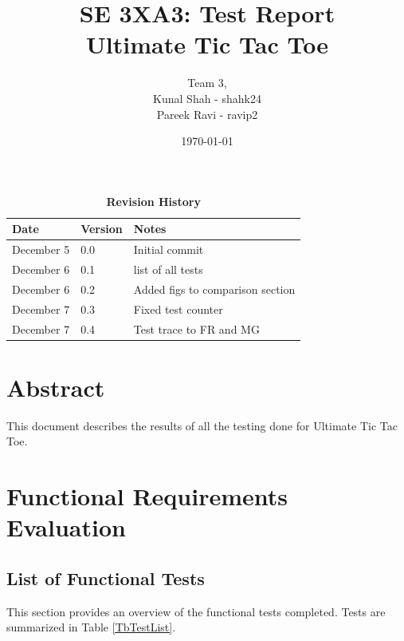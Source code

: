 \documentclass[12pt, titlepage]{article}
\title{SE 3XA3: Test Report\\Ultimate Tic Tac Toe}
\author{Team 3,
		\\ Kunal Shah - shahk24
		\\ Pareek Ravi - ravip2
}
\date{\today}
\begin{document}

\maketitle

\tableofcontents
\listoftables
\listoffigures

\newpage
\begin{table}[hp]
\caption{\bf Revision History}
\begin{tabularx}{\textwidth}{p{3cm}p{2cm}X}
\toprule {\bf Date} & {\bf Version} & {\bf Notes}\\
\midrule
December 5 & 0.0 & Initial commit\\
December 6 & 0.1 & list of all tests\\
December 6 & 0.2 & Added figs to comparison section\\
December 7 & 0.3 & Fixed test counter\\
December 7 & 0.4 & Test trace to FR and MG\\

\bottomrule
\end{tabularx}
\end{table}

\newpage


\section*{Abstract}
This document describes the results of all the testing done for Ultimate Tic Tac Toe.

\section{Functional Requirements Evaluation}
\subsection* {List of Functional Tests}

This section provides an overview of the functional tests completed. Tests are summarized in Table \ref{TbTestList}. 
\end{document}
